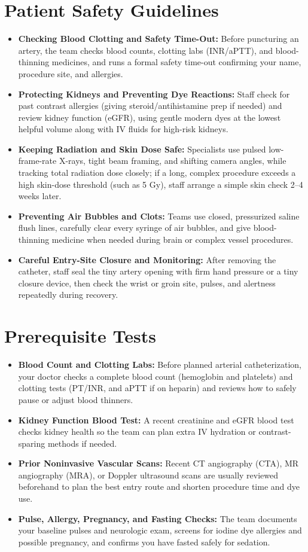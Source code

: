 \section{Patient Safety Guidelines}
\begin{itemize}
\item \textbf{Checking Blood Clotting and Safety Time-Out:} Before puncturing an artery, the team checks blood counts, clotting labs (INR/aPTT), and blood-thinning medicines, and runs a formal safety time-out confirming your name, procedure site, and allergies.
\item \textbf{Protecting Kidneys and Preventing Dye Reactions:} Staff check for past contrast allergies (giving steroid/antihistamine prep if needed) and review kidney function (eGFR), using gentle modern dyes at the lowest helpful volume along with IV fluids for high-risk kidneys.
\item \textbf{Keeping Radiation and Skin Dose Safe:} Specialists use pulsed low-frame-rate X-rays, tight beam framing, and shifting camera angles, while tracking total radiation dose closely; if a long, complex procedure exceeds a high skin-dose threshold (such as 5 Gy), staff arrange a simple skin check 2--4 weeks later.
\item \textbf{Preventing Air Bubbles and Clots:} Teams use closed, pressurized saline flush lines, carefully clear every syringe of air bubbles, and give blood-thinning medicine when needed during brain or complex vessel procedures.
\item \textbf{Careful Entry-Site Closure and Monitoring:} After removing the catheter, staff seal the tiny artery opening with firm hand pressure or a tiny closure device, then check the wrist or groin site, pulses, and alertness repeatedly during recovery.
\end{itemize}

\section{Prerequisite Tests}
\begin{itemize}
\item \textbf{Blood Count and Clotting Labs:} Before planned arterial catheterization, your doctor checks a complete blood count (hemoglobin and platelets) and clotting tests (PT/INR, and aPTT if on heparin) and reviews how to safely pause or adjust blood thinners.
\item \textbf{Kidney Function Blood Test:} A recent creatinine and eGFR blood test checks kidney health so the team can plan extra IV hydration or contrast-sparing methods if needed.
\item \textbf{Prior Noninvasive Vascular Scans:} Recent CT angiography (CTA), MR angiography (MRA), or Doppler ultrasound scans are usually reviewed beforehand to plan the best entry route and shorten procedure time and dye use.
\item \textbf{Pulse, Allergy, Pregnancy, and Fasting Checks:} The team documents your baseline pulses and neurologic exam, screens for iodine dye allergies and possible pregnancy, and confirms you have fasted safely for sedation.
\end{itemize}

